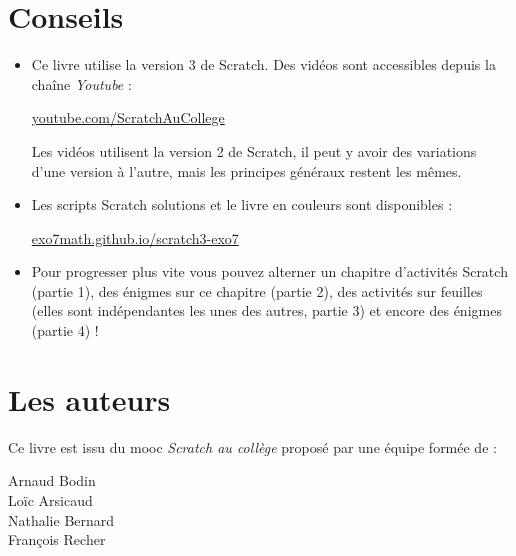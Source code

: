 
\clearemptydoublepage
\pagestyle{empty}\thispagestyle{empty}


\section*{Conseils}

\vspace*{-1ex}

\begin{itemize}
  \item Ce livre utilise la version 3 de Scratch. 
Des vidéos sont accessibles depuis la chaîne \emph{Youtube} :

\centerline{
\href{https://www.youtube.com/c/ScratchAuCollege}{youtube.com/ScratchAuCollege}}

Les vidéos utilisent la version 2 de Scratch, il peut y avoir des variations 
d'une version à l'autre, mais les principes généraux restent les mêmes. 
  
  \item Les scripts Scratch solutions et le livre en couleurs sont disponibles :

  \centerline{\href{https://exo7math.github.io/scratch3-exo7/}{exo7math.github.io/scratch3-exo7}}

  \item  Pour progresser plus vite vous pouvez alterner un chapitre  d'activités Scratch (partie 1), des énigmes sur ce chapitre (partie 2), des activités sur feuilles (elles sont indépendantes les unes des autres, partie 3) et encore des énigmes (partie 4) ! 
\end{itemize}




\section*{Les auteurs}

\vspace*{-1ex}

Ce livre est issu du mooc \emph{Scratch au collège} proposé par une équipe formée de :
\begin{center}
Arnaud Bodin\\
Loïc Arsicaud\\
Nathalie Bernard\\
François Recher
\end{center}

\medskip 


